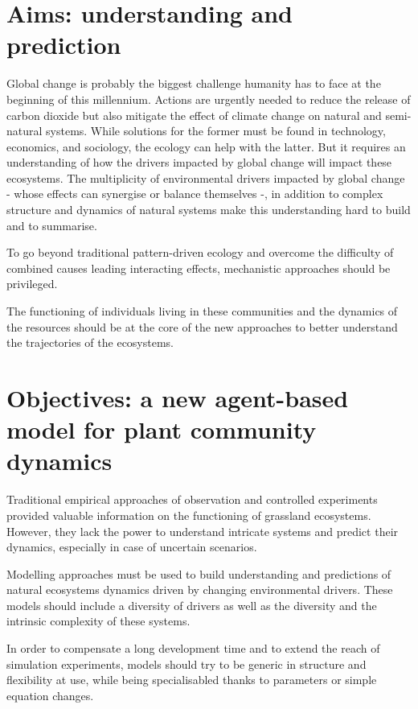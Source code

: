 \section{Aims: understanding and prediction}

Global change is probably the biggest challenge humanity has to face at the beginning of this millennium. Actions are urgently needed to reduce the release of carbon dioxide but also mitigate the effect of climate change on natural and semi-natural systems. While solutions for the former must be found in technology, economics, and sociology, the ecology can help with the latter. But it requires an understanding of how the drivers impacted by global change will impact these ecosystems. The multiplicity of environmental drivers impacted by global change - whose effects can synergise or balance themselves -, in addition to complex structure and dynamics of natural systems make this understanding hard to build and to summarise.

To go beyond traditional pattern-driven ecology and overcome the difficulty of combined causes leading interacting effects, mechanistic approaches should be privileged. 

The functioning of individuals living in these communities and the dynamics of the resources should be at the core of the new approaches to better understand the trajectories of the ecosystems.

%

\section{Objectives: a new agent-based model for plant community dynamics} %
Traditional empirical approaches of observation and controlled experiments provided valuable information on the functioning of grassland ecosystems. However, they lack the power to understand intricate systems and predict their dynamics, especially in case of uncertain scenarios. 

Modelling approaches must be used to build understanding and predictions of natural ecosystems dynamics driven by changing environmental drivers. These models should include a diversity of drivers as well as the diversity and the intrinsic complexity of these systems.

In order to compensate a long development time and to extend the reach of simulation experiments, models should try to be generic in structure and flexibility at use, while being specialisabled thanks to parameters or simple equation changes.

